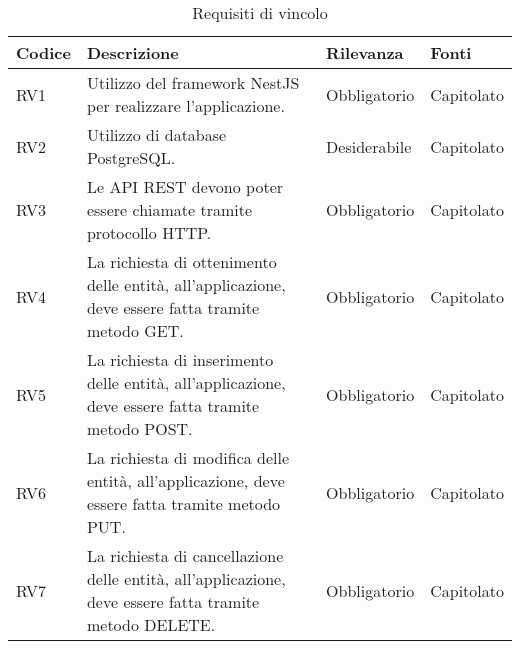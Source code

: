 \begin{table}[H]
    \begin{tabular}{|p{1cm}|p{6cm}|p{1.9cm}|p{1.8cm}|} 
    \hline
    Codice & Descrizione & Rilevanza &  Fonti \\ 
    \hline
    RV1 & Utilizzo del framework NestJS per realizzare l'applicazione. & Obbligatorio & Capitolato \\ 
    \hline
    RV2 & Utilizzo di database PostgreSQL. & Desiderabile & Capitolato \\ 
    \hline
    RV3 & Le \gls{API} \gls{REST} devono poter essere chiamate tramite protocollo \gls{HTTP}. & Obbligatorio & Capitolato \\ 
    \hline
    RV4 & La richiesta di ottenimento delle entità, all'applicazione, deve essere fatta tramite metodo GET. & 
        Obbligatorio & Capitolato \\ 
    \hline
    RV5 & La richiesta di inserimento delle entità, all'applicazione, deve essere fatta tramite metodo POST. & 
        Obbligatorio & Capitolato \\ 
    \hline
    RV6 & La richiesta di modifica delle entità, all'applicazione, deve essere fatta tramite metodo PUT. & 
        Obbligatorio & Capitolato \\ 
    \hline
    RV7 & La richiesta di cancellazione delle entità, all'applicazione, deve essere fatta tramite metodo DELETE. & 
        Obbligatorio & Capitolato \\ 
    \hline
    \end{tabular}
    \caption{Requisiti di vincolo}
\end{table}